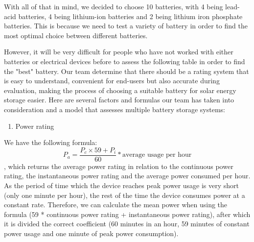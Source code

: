 With all of that in mind, we decided to choose 10 batteries, with 4 being lead-acid batteries, 4 being lithium-ion batteries and 2 being lithium iron phosphate batteries. This is because we need to test a variety of battery in order to find the most optimal choice between different batteries.
\newpage

However, it will be very difficult for people who have not worked with either batteries or electrical devices before to assess the following table in order to find the "best" battery. Our team determine that there should be a rating system that is easy to understand, convenient for end-users but also accurate during evaluation, making the process of choosing a suitable battery for solar energy storage easier. Here are several factors and formulas our team has taken into consideration and a model that assesses multiple battery storage systems:

\begin{enumerate}
    \item Power rating
\end{enumerate}
We have the following formula:
\[
P_a = \frac{P_c \times 59 + P_i}{60} * \text{average usage per hour}
\]
, which returns the average power rating in relation to the continuous power rating, the instantaneous power rating and the average power consumed per hour. As the period of time which the device reaches peak power usage is very short (only one minute per hour), the rest of the time the device consumes power at a constant rate. Therefore, we can calculate the mean power when using the formula (59 * continuous power rating + instantaneous power rating), after which it is divided the correct coefficient (60 minutes in an hour, 59 minutes of constant power usage and one minute of peak power consumption).

